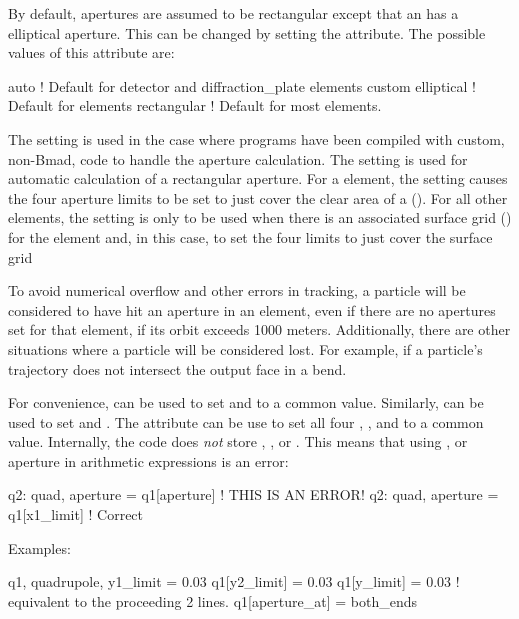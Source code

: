 By default, apertures are assumed to be rectangular except that an
 has a elliptical aperture. This can be changed by
setting the  attribute. The possible values of this
attribute are:
\begin{example}
  auto         ! Default for detector and diffraction_plate elements
  custom
  elliptical   ! Default for  elements
  rectangular  ! Default for most elements.
\end{example}
The  setting is used in the case where programs have been
compiled with custom, non-Bmad, code to handle the aperture
calculation.  The  setting is used for automatic calculation
of a rectangular aperture. For a  element, the
 setting causes the four aperture limits to be set to just
cover the clear area of a 
(). For all other elements, the 
setting is only to be used when there is an associated surface grid
() for the element and, in this case, \bmad to set
the four limits to just cover the surface grid

To avoid numerical overflow and other errors in tracking, a particle
will be considered to have hit an aperture in an element, even if
there are no apertures set for that element, if its orbit exceeds 1000
meters. Additionally, there are other situations where a particle will
be considered lost. For example, if a particle's trajectory does
not intersect the output face in a bend.

For convenience,  can be used to set  and
 to a common value. Similarly,  can be used
to set  and .  The  attribute
can be use to set all four , , 
and  to a common value. Internally, the \bmad code does {\em not}
store , , or . This means that
using ,  or aperture in arithmetic expressions is
an error:
\begin{example}
  q2: quad, aperture = q1[aperture]   ! THIS IS AN ERROR!
  q2: quad, aperture = q1[x1_limit]   ! Correct
\end{example}

Examples:
\begin{example}
  q1, quadrupole, y1_limit = 0.03
  q1[y2_limit] = 0.03
  q1[y_limit] = 0.03  ! equivalent to the proceeding 2 lines.  
  q1[aperture_at] = both_ends
\end{example}

